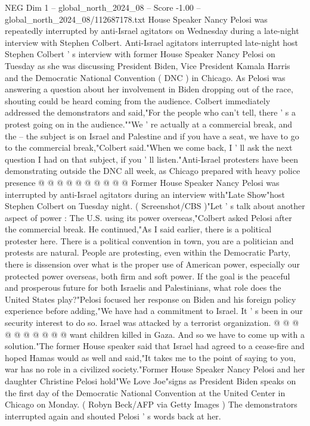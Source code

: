 \begin{textsample}{NEG Dim 1 – global\_north\_2024\_08 – Score -1.00 – global\_north\_2024\_08/112687178.txt}  \label{ex:f1_neg_042}
House Speaker Nancy Pelosi was repeatedly interrupted by anti-Israel agitators on Wednesday during a late-night interview with Stephen Colbert.
Anti-Israel agitators interrupted late-night host Stephen Colbert ' s interview with former House Speaker Nancy Pelosi on Tuesday as she was discussing President Biden, Vice President Kamala Harris and the Democratic National Convention ( DNC ) in Chicago.
As Pelosi was answering a question about her involvement in Biden dropping out of the race, shouting could be heard coming from the audience.
Colbert immediately addressed the demonstrators and said,"For the people who can't tell, there ' s a protest going on in the audience.""We ' re actually at a commercial break, and the -- the subject is on Israel and Palestine and if you have a seat, we have to go to the commercial break,"Colbert said."When we come back, I ' ll ask the next question I had on that subject, if you ' ll listen."Anti-Israel protesters have been demonstrating outside the DNC all week, as Chicago prepared with heavy police presence @ @ @ @ @ @ @ @ @ @ Former House Speaker Nancy Pelosi was interrupted by anti-Israel agitators during an interview with"Late Show"host Stephen Colbert on Tuesday night. ( Screenshot/CBS )"Let ' s talk about another aspect of power : The U.S. using its power overseas,"Colbert asked Pelosi after the commercial break.
He continued,"As I said earlier, there is a political protester here.
There is a political convention in town, you are a politician and protests are natural.
People are protesting, even within the Democratic Party, there is dissension over what is the proper use of American power, especially our protected power overseas, both firm and soft power.
If the goal is the peaceful and prosperous future for both Israelis and Palestinians, what role does the United States play?"Pelosi focused her response on Biden and his foreign policy experience before adding,"We have had a commitment to Israel.
It ' s been in our security interest to do so.
Israel was attacked by a terrorist organization. @ @ @ @ @ @ @ @ @ @ want children killed in Gaza.
And so we have to come up with a solution."The former House speaker said that Israel had agreed to a cease-fire and hoped Hamas would as well and said,"It takes me to the point of saying to you, war has no role in a civilized society."Former House Speaker Nancy Pelosi and her daughter Christine Pelosi hold"We Love Joe"signs as President Biden speaks on the first day of the Democratic National Convention at the United Center in Chicago on Monday. ( Robyn Beck/AFP via Getty Images ) The demonstrators interrupted again and shouted Pelosi ' s words back at her.

\end{textsample}
